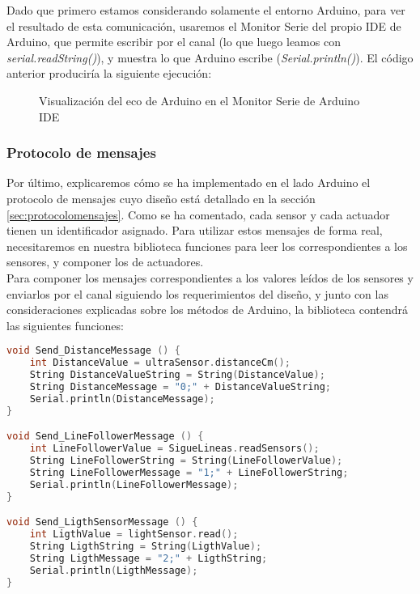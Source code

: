 Dado que primero estamos considerando solamente el entorno Arduino, para ver el resultado de esta comunicación, usaremos el Monitor Serie del propio IDE de Arduino, que permite escribir por el canal (lo que luego leamos con \textit{serial.readString()}), y muestra lo que Arduino escribe (\textit{Serial.println()}). El código anterior produciría la siguiente ejecución:
\begin{figure}[h]
	\centering	
	\begin{subfigure}
		[Escribir el String que Arduino lee del canal]{
			\texttt{[image: MonitorEnviar.png]}
			\label{img:ComunicacionArduinoEnviar}}
	\end{subfigure}
	\begin{subfigure}
		[Muestra el String que Arduino ha escrito en el canal]{
			\texttt{[image: MonitorRespuesta.png]}
			\label{img:ComunicacionArduinoLeer}}
	\end{subfigure}
	\label{img:ComunicacionArduinoMonitorSerie}
	\caption{Visualización del eco de Arduino en el Monitor Serie de Arduino IDE}
\end{figure}


\subsubsection{Protocolo de mensajes}\label{subsubsec:mensajesArduino}

Por último, explicaremos cómo se ha implementado en el lado Arduino el protocolo de mensajes cuyo diseño está detallado en la sección  \ref{sec:protocolomensajes}. Como se ha comentado, cada sensor y cada actuador tienen un identificador asignado.
Para utilizar estos mensajes de forma real, necesitaremos en nuestra biblioteca funciones para leer los correspondientes a los sensores, y  componer los de actuadores. \\

Para componer los mensajes correspondientes a los valores leídos de los sensores y enviarlos por el canal siguiendo los requerimientos del diseño, y junto con las consideraciones explicadas sobre los métodos de Arduino, la biblioteca contendrá las siguientes funciones:
 
\begin{lstlisting}[language=C,caption={Envío de mensajes para los sensores}]
void Send_DistanceMessage () {
	int DistanceValue = ultraSensor.distanceCm();
	String DistanceValueString = String(DistanceValue);
	String DistanceMessage = "0;" + DistanceValueString; 
	Serial.println(DistanceMessage);
}

void Send_LineFollowerMessage () {
	int LineFollowerValue = SigueLineas.readSensors();
	String LineFollowerString = String(LineFollowerValue);
	String LineFollowerMessage = "1;" + LineFollowerString; 
	Serial.println(LineFollowerMessage);
}

void Send_LigthSensorMessage () {
	int LigthValue = lightSensor.read();
	String LigthString = String(LigthValue);
	String LigthMessage = "2;" + LigthString; 
	Serial.println(LigthMessage);
}
\end{lstlisting}

